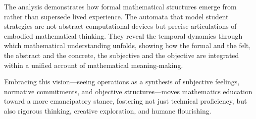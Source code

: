 \documentclass[12pt]{book}
\begin{document}
The analysis demonstrates how formal mathematical structures emerge from rather than supersede lived experience. The automata that model student strategies are not abstract computational devices but precise articulations of embodied mathematical thinking. They reveal the temporal dynamics through which mathematical understanding unfolds, showing how the formal and the felt, the abstract and the concrete, the subjective and the objective are integrated within a unified account of mathematical meaning-making.

Embracing this vision---seeing operations as a synthesis of subjective feelings, normative commitments, and objective structures---moves mathematics education toward a more emancipatory stance, fostering not just technical proficiency, but also rigorous thinking, creative exploration, and humane flourishing.


\printbibliography
\end{document}
